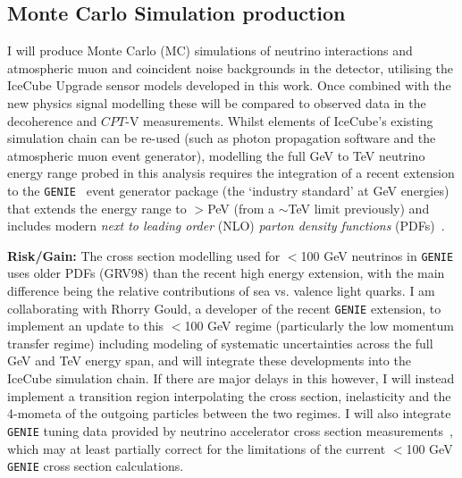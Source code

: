 \documentclass[a4paper,11pt]{article}
\begin{document}
\subsection{Monte Carlo Simulation production}

I will produce Monte Carlo (MC) simulations of neutrino interactions and atmospheric muon and coincident noise backgrounds in the detector, utilising the IceCube Upgrade sensor models developed in this work. Once combined with the new physics signal modelling these will be compared to observed data in the decoherence and $CPT$-V measurements. Whilst elements of IceCube's existing simulation chain can be re-used (such as photon propagation software and the atmospheric muon event generator), modelling the full GeV to TeV neutrino energy range probed in this analysis requires the integration of a recent extension to the \texttt{GENIE}~\cite{Andreopoulos:2009zz} event generator package (the `industry standard' at GeV energies) that extends the energy range to $>$PeV (from a $\sim$TeV limit previously) and includes modern \textit{next to leading order} (NLO) \textit{parton density functions} (PDFs)~\cite{Garcia:2019hze}. 

\textbf{Risk/Gain:} The cross section modelling used for $<$100 GeV neutrinos in \texttt{GENIE} uses older PDFs (GRV98) than the recent high energy extension, with the main difference being the relative contributions of sea vs. valence light quarks. I am collaborating with Rhorry Gould, a developer of the recent \texttt{GENIE} extension, to implement an update to this $<$100 GeV regime (particularly the low momentum transfer regime) including modeling of systematic uncertainties across the full GeV and TeV energy span, and will integrate these developments into the IceCube simulation chain. If there are major delays in this however, I will instead implement a transition region interpolating the cross section, inelasticity and the 4-mometa of the outgoing particles between the two regimes. I will also integrate \texttt{GENIE} tuning data provided by neutrino accelerator cross section measurements~\cite{Stowell:2019zsh, Acero:2020eit}, which may at least partially correct for the limitations of the current $<$100 GeV \texttt{GENIE} cross section calculations.


\end{document}
